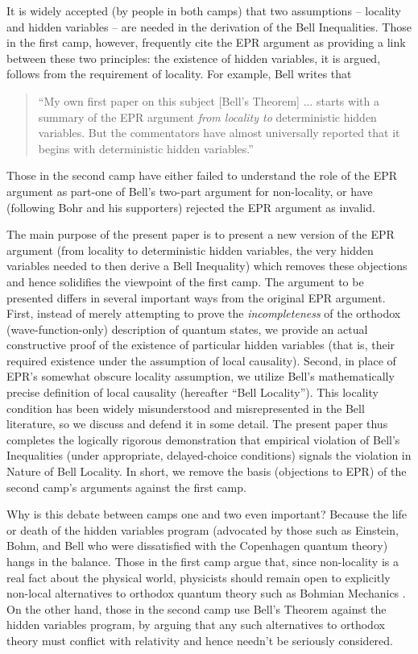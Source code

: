\documentclass[aps,prc,onecolumn,12pt]{revtex4-2}
\begin{document}
It is widely accepted (by people in both camps) that two assumptions
-- locality and hidden variables -- are needed in the derivation of
the Bell Inequalities.  Those in the first camp, however, frequently
cite the EPR argument \cite{epr} as providing a link between these two
principles:  the existence of hidden variables, it is argued,
follows from the requirement of locality.  For example, Bell writes that
\begin{quote}
``My own first paper on this subject [Bell's Theorem] ...
starts with a summary of the EPR argument \emph{from locality to}
deterministic hidden variables.  But the commentators have almost
universally reported that it begins with deterministic hidden
variables.'' \cite[pg 157]{bell}
\end{quote}
Those in the second camp have either failed to understand the role of
the EPR argument as part-one of Bell's two-part argument for
non-locality, or have (following Bohr and his supporters) rejected the
EPR argument as invalid.

The main purpose of the present paper is to present a new version of
the EPR argument (from locality to deterministic hidden variables, the
very hidden variables needed to then derive a Bell Inequality) which
removes these objections and hence solidifies the viewpoint of the
first camp.  The
argument to be presented differs in several important ways from
the original EPR argument.  First, instead of merely attempting to
prove the \emph{incompleteness} of the orthodox (wave-function-only)
description of quantum states, we provide an actual constructive proof
of the existence of particular hidden variables (that is, their
required existence under the
assumption of local causality).  Second, in place of EPR's somewhat
obscure locality assumption, we utilize Bell's mathematically precise
definition of local causality (hereafter ``Bell Locality'').  This
locality condition has been widely misunderstood and misrepresented in
the Bell literature, so we discuss and defend it in some detail.  The
present paper thus completes the logically rigorous demonstration that
empirical violation of Bell's Inequalities (under appropriate,
delayed-choice conditions) signals the violation in Nature of Bell
Locality.  In short, we remove the basis (objections to EPR) of the
second camp's arguments against the first camp.

Why is this debate between camps one and two even important?
Because the life or
death of the hidden variables program (advocated by those such as
Einstein, Bohm, and Bell who were dissatisfied with the Copenhagen
quantum theory) hangs in the balance.  Those in the first camp
argue that, since non-locality is a real fact about the
physical world, physicists should remain open to
explicitly non-local alternatives to orthodox quantum theory
such as Bohmian Mechanics  \cite{bohmmech}.
On the other hand, those in the second camp use Bell's Theorem against
the hidden variables program, by arguing that any such alternatives to
orthodox theory must conflict with relativity and hence needn't be
seriously considered.
\end{document}
